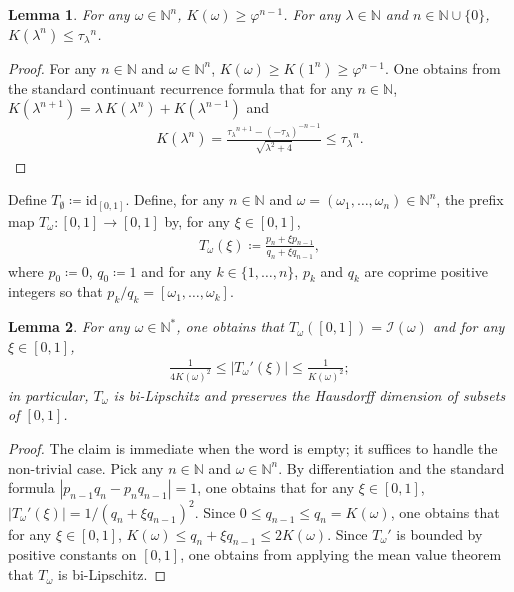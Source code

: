 \documentclass[12pt,reqno]{amsart}
\theoremstyle{definition}
\theoremstyle{plain}
\newtheorem{lemma}{Lemma}
\begin{document}
\begin{lemma}
\label{lem:continuant-growth}
For any $\omega\in\mathbb{N}^n$, $K(\omega)\geq \varphi^{n-1}$. For any $\lambda\in\mathbb{N}$ and $n\in\mathbb{N}\cup\{0\}$, $K(\lambda^n)\leq {\tau_\lambda}^n$.
\end{lemma}
\begin{proof}
For any $n\in\mathbb{N}$ and $\omega\in\mathbb{N}^n$, $K(\omega)\geq K(1^n)\geq \varphi^{n-1}$. One obtains from the standard continuant recurrence formula that for any $n\in\mathbb{N}$, $K(\lambda^{n+1})=\lambda\,K(\lambda^n)+K(\lambda^{n-1})$ and 
\begin{align*}
    K(\lambda^n)
    =\frac{{\tau_\lambda}^{n+1}-(-\tau_\lambda)^{-n-1}}{\sqrt{\lambda^2+4}}
    \leq{\tau_\lambda}^n.
\end{align*}
\end{proof}
Define $T_{\emptyset}\coloneqq\mathrm{id}_{[0,1]}$. Define, for any $n\in\mathbb{N}$ and $\omega=(\omega_1,\ldots,\omega_n)\in\mathbb{N}^n$, the prefix map $T_\omega:[0,1]\to[0,1]$ by, for any $\xi\in[0,1]$,
\begin{align*}
    T_\omega(\xi)\coloneqq \frac{p_n+\xi p_{n-1}}{q_n+\xi q_{n-1}},
\end{align*}
where $p_0\coloneqq0$, $q_0\coloneqq 1$ and for any $k\in\{1,\ldots,n\}$, $p_k$ and $q_k$ are coprime positive integers so that $p_k/q_k=[\omega_1,\ldots,\omega_k]$. 

\begin{lemma}
\label{lem:prefix-map-derivative}
For any $\omega\in\mathbb{N}^*$, one obtains that $T_\omega([0,1])=\mathcal{I}(\omega)$ and for any $\xi\in[0,1]$, 
\begin{align*}
    \frac{1}{4K(\omega)^2}
    \leq\left|T_\omega'(\xi)\right|
    \leq\frac{1}{K(\omega)^2};
\end{align*}
in particular, $T_\omega$ is bi-Lipschitz and preserves the Hausdorff dimension of subsets of $[0,1]$.
\end{lemma}
\begin{proof}
The claim is immediate when the word is empty; it suffices to handle the non-trivial case. Pick any $n\in\mathbb{N}$ and $\omega\in\mathbb{N}^n$. By differentiation and the standard formula $|p_{n-1}q_n-p_nq_{n-1}|=1$, one obtains that for any $\xi\in[0,1]$, $\left|T_\omega'(\xi)\right|=1/(q_n+\xi q_{n-1})^2$. Since $0\leq q_{n-1}\leq q_n=K(\omega)$, one obtains that for any $\xi\in[0,1]$, $K(\omega)\leq q_n+\xi q_{n-1}\leq 2K(\omega)$. Since $T_\omega'$ is bounded by positive constants on $[0,1]$, one obtains from applying the mean value theorem that $T_\omega$ is bi-Lipschitz.
\end{proof}
\end{document}
